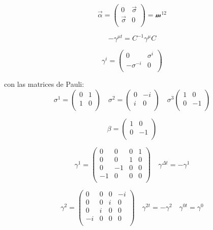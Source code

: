 \documentclass{report}
\begin{document}
\[ \overrightarrow{\alpha} = \left ( \begin{array}{cc}
 0 & \overrightarrow{\sigma}  \\
 \overrightarrow{\sigma} & 0  \\
 \end{array} \right) = \mathscr{m}^{12}
\]

\begin{equation}
- \gamma^{\mu t}  = C^{-1} \gamma^{\mu} C
\end{equation}

\[\gamma^i = \left ( \begin{array}{cc}
 0 & \sigma^{i}  \\
 -\sigma^{-i} & 0  \\
 \end{array} \right) 
\]

con las matrices de Pauli:
 \[\sigma^1 = \left ( \begin{array}{cc}
 0 & 1  \\
 1 & 0  \\
 \end{array} \right)
\quad \sigma^2 = \left ( \begin{array}{cc}
 0 & -i  \\
 i & 0  \\
 \end{array} \right)
 \quad \sigma^3 \left ( \begin{array}{cc}
 1 & 0  \\
 0 & -1  \\
 \end{array} \right)\]

\[\beta = \left ( \begin{array}{cc}
 1 & 0  \\
 0 & -1  \\
 \end{array} \right) 
\]

\[\gamma^{1} = \left ( \begin{array}{cccc}
 0 & 0 & 0 & 1 \\
 0 & 0 & 1 & 0 \\
 0 & -1 & 0 & 0 \\
-1 & 0 & 0 & 0 \\ \end{array} \right) 
 \quad \gamma^{\Delta t} = -\gamma^1
\]

\[\gamma^{2} = \left ( \begin{array}{cccc}
 0 & 0 & 0 & -i \\
 0 & 0 & i & 0 \\
 0 & i & 0 & 0 \\
-i & 0 & 0 & 0 \\ \end{array} \right) 
 \quad \gamma^{2 t} = -\gamma^2 \quad \gamma^{0t} = \gamma^0
\]
\end{document}
